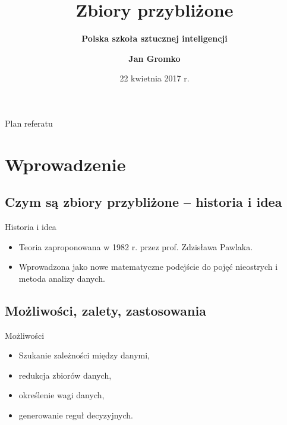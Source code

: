 \documentclass[10pt]{beamer}
\title[Polska szkoła sztucznej inteligencji – zbiory przybliżone] %
{ %
      \textbf{Zbiory przybliżone}
}
\subtitle[]
{
      \textbf{Polska szkoła sztucznej inteligencji}
}
\author[Jan Gromko]
{
\textbf{Jan Gromko}
}
\institute[SKN Math4You WI PB]
{
      Studenckie Koło Naukowe Math4You\\
      Wydział Informatyki Politechniki Białostockiej
}
\date{22 kwietnia 2017 r.}
\begin{document}
{\1%
\begin{frame}
  \titlepage
\end{frame}}


\begin{frame}{Plan referatu}{}
\tableofcontents
\end{frame}

\section{Wprowadzenie}
\subsection{Czym są zbiory przybliżone – historia i idea}
\begin{frame}{Historia i idea}
\begin{spacing}{1.5}
\begin{itemize}
\item Teoria zaproponowana w 1982 r. przez prof. Zdzisława Pawlaka.
\item Wprowadzona jako nowe matematyczne podejście do pojęć nieostrych i metoda analizy danych.
\end{itemize}
\end{spacing}

\end{frame}


\subsection{Możliwości, zalety, zastosowania}

\begin{frame}{Możliwości}
\begin{spacing}{1.5}
\begin{itemize}
\item Szukanie zależności między danymi,
\item redukcja zbiorów danych,
\item określenie wagi danych,
\item generowanie reguł decyzyjnych.
\end{itemize}
\end{spacing}
\end{frame}
\end{document}
